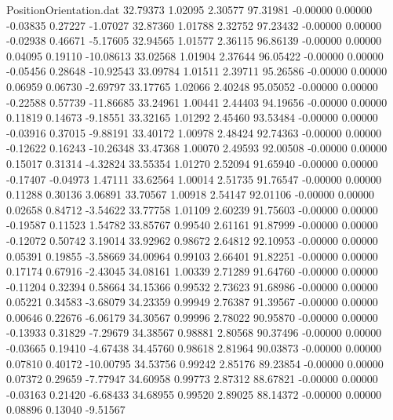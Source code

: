 \begin{filecontents}{PositionOrientation.dat}
  32.79373    1.02095    2.30577    97.31981   -0.00000    0.00000   -0.03835    0.27227   -1.07027
  32.87360    1.01788    2.32752    97.23432   -0.00000    0.00000   -0.02938    0.46671   -5.17605
  32.94565    1.01577    2.36115    96.86139   -0.00000    0.00000    0.04095    0.19110  -10.08613
  33.02568    1.01904    2.37644    96.05422   -0.00000    0.00000   -0.05456    0.28648  -10.92543
  33.09784    1.01511    2.39711    95.26586   -0.00000    0.00000    0.06959    0.06730   -2.69797
  33.17765    1.02066    2.40248    95.05052   -0.00000    0.00000   -0.22588    0.57739  -11.86685
  33.24961    1.00441    2.44403    94.19656   -0.00000    0.00000    0.11819    0.14673   -9.18551
  33.32165    1.01292    2.45460    93.53484   -0.00000    0.00000   -0.03916    0.37015   -9.88191
  33.40172    1.00978    2.48424    92.74363   -0.00000    0.00000   -0.12622    0.16243  -10.26348
  33.47368    1.00070    2.49593    92.00508   -0.00000    0.00000    0.15017    0.31314   -4.32824
  33.55354    1.01270    2.52094    91.65940   -0.00000    0.00000   -0.17407   -0.04973    1.47111
  33.62564    1.00014    2.51735    91.76547   -0.00000    0.00000    0.11288    0.30136    3.06891
  33.70567    1.00918    2.54147    92.01106   -0.00000    0.00000    0.02658    0.84712   -3.54622
  33.77758    1.01109    2.60239    91.75603   -0.00000    0.00000   -0.19587    0.11523    1.54782
  33.85767    0.99540    2.61161    91.87999   -0.00000    0.00000   -0.12072    0.50742    3.19014
  33.92962    0.98672    2.64812    92.10953   -0.00000    0.00000    0.05391    0.19855   -3.58669
  34.00964    0.99103    2.66401    91.82251   -0.00000    0.00000    0.17174    0.67916   -2.43045
  34.08161    1.00339    2.71289    91.64760   -0.00000    0.00000   -0.11204    0.32394    0.58664
  34.15366    0.99532    2.73623    91.68986   -0.00000    0.00000    0.05221    0.34583   -3.68079
  34.23359    0.99949    2.76387    91.39567   -0.00000    0.00000    0.00646    0.22676   -6.06179
  34.30567    0.99996    2.78022    90.95870   -0.00000    0.00000   -0.13933    0.31829   -7.29679
  34.38567    0.98881    2.80568    90.37496   -0.00000    0.00000   -0.03665    0.19410   -4.67438
  34.45760    0.98618    2.81964    90.03873   -0.00000    0.00000    0.07810    0.40172  -10.00795
  34.53756    0.99242    2.85176    89.23854   -0.00000    0.00000    0.07372    0.29659   -7.77947
  34.60958    0.99773    2.87312    88.67821   -0.00000    0.00000   -0.03163    0.21420   -6.68433
  34.68955    0.99520    2.89025    88.14372   -0.00000    0.00000    0.08896    0.13040   -9.51567

\end{filecontents}

